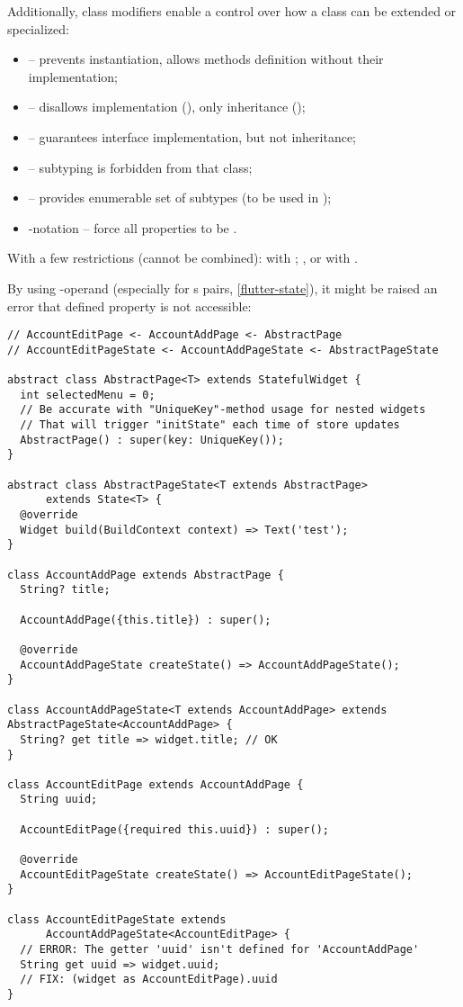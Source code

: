 \noindent Additionally, class modifiers enable a control over how a class can be extended or specialized:

\begin{itemize}
  \item {} -- prevents instantiation, allows methods definition without their implementation;
  \item {} -- disallows implementation (), only inheritance ();
  \item {} -- guarantees interface implementation, but not inheritance;
  \item {} -- subtyping is forbidden from that class;
  \item {} -- provides enumerable set of subtypes (to be used in );
  \item {}-notation -- force all properties to be .
\end{itemize}

\noindent With a few restrictions (cannot be combined):  with ; ,  or 
 with .

\noindent By using -operand (especially for s pairs, \ref{flutter-state}), it might be 
raised an error that defined property is not accessible:

\begin{lstlisting}
// AccountEditPage <- AccountAddPage <- AbstractPage
// AccountEditPageState <- AccountAddPageState <- AbstractPageState

abstract class AbstractPage<T> extends StatefulWidget {
  int selectedMenu = 0;
  // Be accurate with "UniqueKey"-method usage for nested widgets
  // That will trigger "initState" each time of store updates 
  AbstractPage() : super(key: UniqueKey());
}

abstract class AbstractPageState<T extends AbstractPage> 
      extends State<T> {
  @override
  Widget build(BuildContext context) => Text('test');
}

class AccountAddPage extends AbstractPage {
  String? title;

  AccountAddPage({this.title}) : super();

  @override
  AccountAddPageState createState() => AccountAddPageState();
}

class AccountAddPageState<T extends AccountAddPage> extends AbstractPageState<AccountAddPage> {
  String? get title => widget.title; // OK
}

class AccountEditPage extends AccountAddPage {
  String uuid;

  AccountEditPage({required this.uuid}) : super();

  @override
  AccountEditPageState createState() => AccountEditPageState();
}

class AccountEditPageState extends 
      AccountAddPageState<AccountEditPage> {
  // ERROR: The getter 'uuid' isn't defined for 'AccountAddPage'
  String get uuid => widget.uuid; 
  // FIX: (widget as AccountEditPage).uuid
}
\end{lstlisting}


